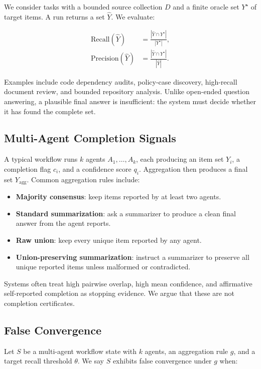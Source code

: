 \documentclass[letterpaper]{article}
\begin{document}
We consider tasks with a bounded source collection $D$ and a finite oracle set
$Y^\star$ of target items. A run returns a set $\hat{Y}$. We evaluate:

\begin{align}
\text{Recall}(\hat{Y}) &= \frac{|\hat{Y} \cap Y^\star|}{|Y^\star|}, \\
\text{Precision}(\hat{Y}) &= \frac{|\hat{Y} \cap Y^\star|}{|\hat{Y}|}.
\end{align}

Examples include code dependency audits, policy-case discovery, high-recall
document review, and bounded repository analysis. Unlike open-ended question
answering, a plausible final answer is insufficient: the system must decide
whether it has found the complete set.

\subsection{Multi-Agent Completion Signals}

A typical workflow runs $k$ agents $A_1, \ldots, A_k$, each producing an item set
$Y_i$, a completion flag $c_i$, and a confidence score $q_i$. Aggregation then
produces a final set $Y_{\text{agg}}$. Common aggregation rules include:

\begin{itemize}
    \item \textbf{Majority consensus}: keep items reported by at least two
    agents.
    \item \textbf{Standard summarization}: ask a summarizer to produce a clean
    final answer from the agent reports.
    \item \textbf{Raw union}: keep every unique item reported by any agent.
    \item \textbf{Union-preserving summarization}: instruct a summarizer to
    preserve all unique reported items unless malformed or contradicted.
\end{itemize}

Systems often treat high pairwise overlap, high mean confidence, and affirmative
self-reported completion as stopping evidence. We argue that these are not
completion certificates.

\subsection{False Convergence}

Let $S$ be a multi-agent workflow state with $k$ agents, an aggregation rule
$g$, and a target recall threshold $\theta$. We say $S$ exhibits false
convergence under $g$ when:
\end{document}
